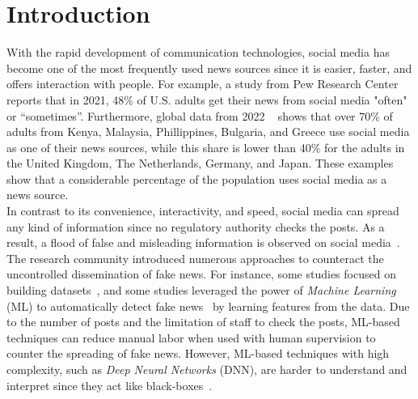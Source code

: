 
\chapter{Introduction}\label{chapter:introduction}

With the rapid development of communication technologies, social media has become one of the most frequently used news sources since
it is easier, faster, and offers interaction with people.
For example, a study from Pew Research Center ~\parencite{NewsConsumptionAcrossSocialMedia_pewresearch}
reports that in 2021, 48\% of U.S. adults get their news from social media "often" or “sometimes”. Furthermore, global data from 2022
~\parencite{StatistaUsageOfSocialMedia_Watson} shows that over 70\% of adults from Kenya, Malaysia,
Phillippines, Bulgaria, and Greece use social media as one of their news sources, while this share is lower than 40\% for the
adults in the United Kingdom, The Netherlands, Germany, and Japan. These examples show that a considerable percentage of the population uses
social media as a news source.\\
In contrast to its convenience, interactivity, and speed, social media can spread any kind of information since no regulatory authority
checks the posts. As a result, a flood of false and misleading information is observed on social
media~\parencite{SocialMediaAndFakeNewsIn2016Election_Allcott}.\\
The research community introduced numerous approaches to counteract the uncontrolled dissemination of fake news. For instance, some studies
focused on building datasets~\parencite{FakeNewsDetectionOnSocialMediaADataMiningPerspective_Shu, LiarLiarPantsOnFire_Wang, FakeReddit_Nakamura, SomeLikeItHoaxDataset_Tacchini, BuzzfaceDataset_Santia, UPFD_Dataset_Shu}, and some studies leveraged the power of \emph{Machine Learning} (ML) to
automatically detect fake news~\parencite{FakeNewsDetectionUsingGeometricDeepLearning_Monti, GraphNeuralNetworksWithContinualLearningFakeNewsDetection_Han, RumorDetectionBidirectionalGraphConvolutionalNetworks_Bian, SAFEFND_Zhou}
by learning features from the data. Due to the number of posts and the limitation of staff to check the posts, ML-based techniques can reduce manual labor when used with human supervision to counter the spreading of fake news. However, ML-based techniques with high complexity, such as \emph{Deep Neural Networks} (DNN), are harder to understand and interpret since they act like black-boxes~\parencite{CanWeOpenTheBlackBoxOfAI_Castelvecchi}.\\
